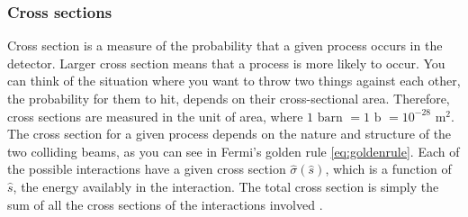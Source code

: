 \subsubsection{Cross sections}
Cross section is a measure of the probability that a given process occurs in the detector. Larger cross section means that a process is more likely to occur. You can think of the situation where you want to throw two things against each other, the probability for them to hit, depends on their cross-sectional area. Therefore, cross sections are measured in the unit of area, where $1\mbox{ barn }=1\mbox{ b }= 10^{-28}$ m$^{2}$. The cross section for a given process depends on the nature and structure of the two colliding beams, as you can see in Fermi's golden rule \eqref{eq:goldenrule}. Each of the possible interactions have a given cross section $\hat \sigma(\hat s)$, which is a function of $\hat s$, the energy availably in the interaction. The total cross section is simply the sum of all the cross sections of the interactions involved \cite{griffiths1987iep}.


